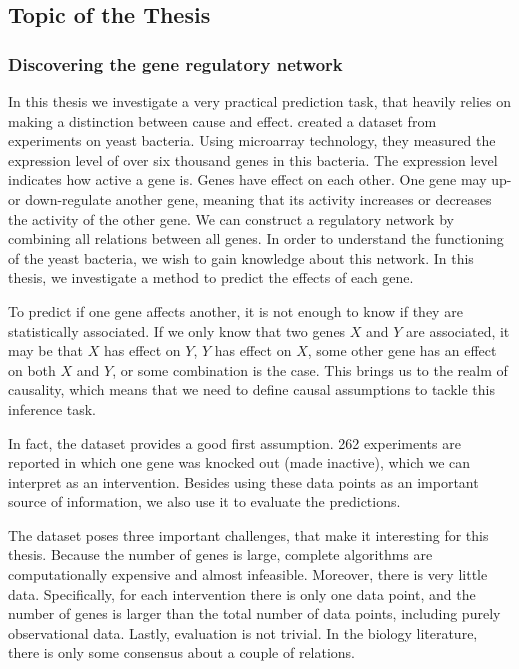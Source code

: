 \subsection{Topic of the Thesis}

\subsubsection{Discovering the gene regulatory network}

In this thesis we investigate a very practical prediction task, that heavily relies on making a distinction between cause and effect. \citet{kemmeren2014large} created a dataset from experiments on yeast bacteria. Using microarray technology, they measured the expression level of over six thousand genes in this bacteria. The expression level indicates how active a gene is. Genes have effect on each other. One gene may up- or down-regulate another gene, meaning that its activity increases or decreases the activity of the other gene. We can construct a regulatory network by combining all relations between all genes. In order to understand the functioning of the yeast bacteria, we wish to gain knowledge about this network. In this thesis, we investigate a method to predict the effects of each gene.

To predict if one gene affects another, it is not enough to know if they are statistically associated. If we only know that two genes $X$ and $Y$ are associated, it may be that $X$ has effect on $Y$, $Y$ has effect on $X$, some other gene has an effect on both $X$ and $Y$, or some combination is the case. This brings us to the realm of causality, which means that we need to define causal assumptions to tackle this inference task. 

In fact, the dataset provides a good first assumption. 262 experiments are reported in which one gene was knocked out (made inactive), which we can interpret as an intervention. Besides using these data points as an important source of information, we also use it to evaluate the predictions.

The dataset poses three important challenges, that make it interesting for this thesis. Because the number of genes is large, complete algorithms are computationally expensive and almost infeasible. Moreover, there is very little data. Specifically, for each intervention there is only one data point, and the number of genes is larger than the total number of data points, including purely observational data. Lastly, evaluation is not trivial. In the biology literature, there is only some consensus about a couple of relations.

